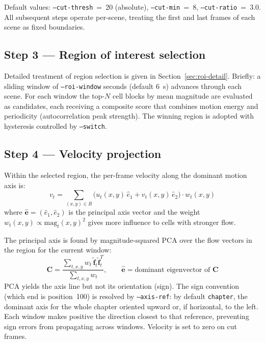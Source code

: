 \documentclass[12pt,a4paper]{article}
\begin{document}
Default values: \texttt{--cut-thresh}~=~20 (absolute), \texttt{--cut-min}~=~8,
\texttt{--cut-ratio}~=~3.0. All subsequent steps operate per-scene, treating
the first and last frames of each scene as fixed boundaries.

\subsection{Step 3 --- Region of interest selection}
\label{sec:roi}

Detailed treatment of region selection is given in
Section~\ref{sec:roi-detail}. Briefly: a sliding window of
\texttt{--roi-window} seconds (default 6~s) advances through each scene. For
each window the top-$N$ cell blocks by mean magnitude are evaluated as
candidates, each receiving a composite score that combines motion energy and
periodicity (autocorrelation peak strength). The winning region is adopted with
hysteresis controlled by \texttt{--switch}.

\subsection{Step 4 --- Velocity projection}
\label{sec:velocity}

Within the selected region, the per-frame velocity along the dominant motion
axis is:
\begin{equation}
  v_t = \sum_{(x,y)\in R}
        \bigl(u_t(x,y)\,\hat{e}_1 + v_t(x,y)\,\hat{e}_2\bigr)
        \cdot w_t(x,y)
\end{equation}
where $\hat{\mathbf{e}} = (\hat{e}_1, \hat{e}_2)$ is the principal axis
vector and the weight $w_t(x,y) \propto \mathrm{mag}_t(x,y)^2$ gives more
influence to cells with stronger flow.

The principal axis is found by magnitude-squared PCA over the flow vectors in
the region for the current window:
\begin{equation}
  \mathbf{C} = \frac{\sum_{t,x,y} w_t \,\tilde{\mathbf{f}}_t \tilde{\mathbf{f}}_t^T}
                    {\sum_{t,x,y} w_t},
  \qquad
  \hat{\mathbf{e}} = \text{dominant eigenvector of } \mathbf{C}
\end{equation}
PCA yields the axis line but not its orientation (sign). The sign convention
(which end is position~100) is resolved by \texttt{--axis-ref}: by default
\texttt{chapter}, the dominant axis for the whole chapter oriented upward or,
if horizontal, to the left. Each window makes positive the direction closest to
that reference, preventing sign errors from propagating across windows.
Velocity is set to zero on cut frames.
\end{document}
